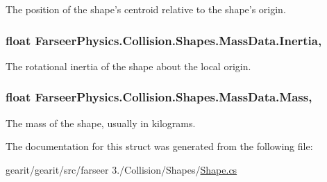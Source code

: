 The position of the shape's centroid relative to the shape's origin. 

\hypertarget{struct_farseer_physics_1_1_collision_1_1_shapes_1_1_mass_data_a2137b2a60ea838ed57bca3025281d5d0}{
\subsubsection[{Inertia}]{\setlength{\rightskip}{0pt plus 5cm}float Farseer\+Physics.\+Collision.\+Shapes.\+Mass\+Data.\+Inertia\hspace{0.3cm}{\ttfamily [get]}, {\ttfamily [set]}}}\label{struct_farseer_physics_1_1_collision_1_1_shapes_1_1_mass_data_a2137b2a60ea838ed57bca3025281d5d0}


The rotational inertia of the shape about the local origin. 

\hypertarget{struct_farseer_physics_1_1_collision_1_1_shapes_1_1_mass_data_acbb6b19c8cf9c778e7fd09693cb53895}{
\subsubsection[{Mass}]{\setlength{\rightskip}{0pt plus 5cm}float Farseer\+Physics.\+Collision.\+Shapes.\+Mass\+Data.\+Mass\hspace{0.3cm}{\ttfamily [get]}, {\ttfamily [set]}}}\label{struct_farseer_physics_1_1_collision_1_1_shapes_1_1_mass_data_acbb6b19c8cf9c778e7fd09693cb53895}


The mass of the shape, usually in kilograms. 



The documentation for this struct was generated from the following file\+:\begin{DoxyCompactItemize}
\item 
gearit/gearit/src/farseer 3./\+Collision/\+Shapes/\hyperlink{_shape_8cs}{Shape.\+cs}\end{DoxyCompactItemize}
